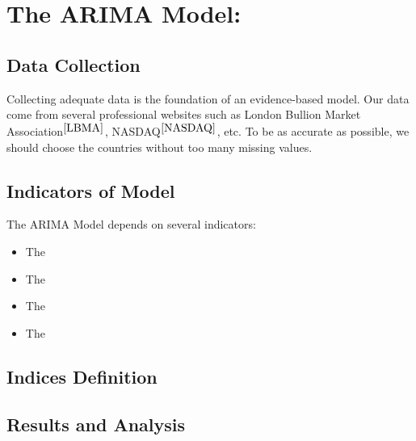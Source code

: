 \MinParskip{}

\section{The ARIMA Model: }


\subsection{Data Collection}

Collecting adequate data is the foundation of an evidence-based model. Our data come from several professional websites such as London Bullion Market Association$^{\cite{LBMA}}$, NASDAQ$^{\cite{NASDAQ}}$, etc. To be as accurate as possible, we should choose the countries without too many missing values.

\subsection{Indicators of Model}

The ARIMA Model depends on several indicators:

\begin{itemize}
    \item The 
\end{itemize}

\begin{itemize}
    \item The 
\end{itemize}

\begin{itemize}
    \item The 
\end{itemize}

\begin{itemize}
    \item The
\end{itemize}

\subsection{Indices Definition}

\subsection{Results and Analysis}